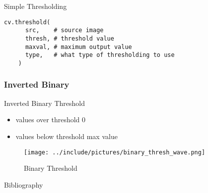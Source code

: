 \documentclass[aspectratio=169]{beamer}
\begin{document}
\begin{frame}[fragile]{Simple Thresholding}
  \begin{verbatim}
cv.threshold(
      src,    # source image
      thresh, # threshold value
      maxval, # maximum output value
      type,   # what type of thresholding to use
    )
  \end{verbatim}
\end{frame}

\subsubsection{Inverted Binary}
\begin{frame}{Inverted Binary Threshold}
    \begin{itemize}
        \item values over threshold  0
        \item values below threshold  max value
    \end{itemize}
    \begin{figure}
      \centering
      \texttt{[image: ../include/pictures/binary\_thresh\_wave.png]}
      \caption{Binary Threshold\footnotemark}
    \end{figure}

\end{frame}

\begin{frame}[allowframebreaks]{Bibliography}
\printbibliography
\end{frame}
\end{document}
